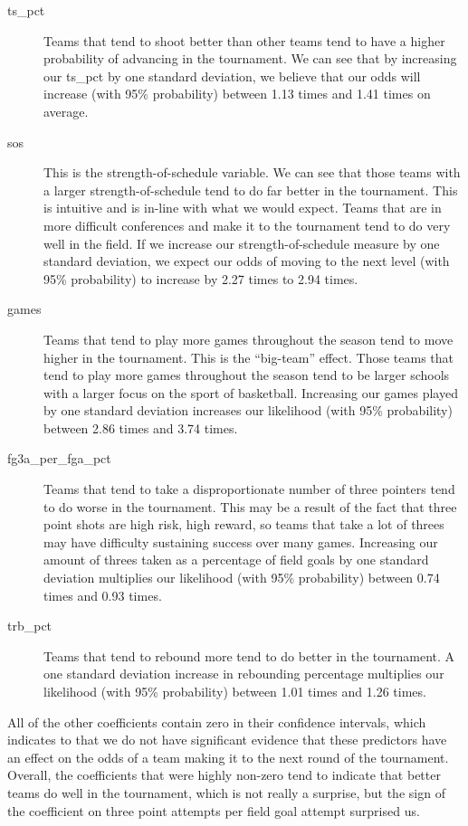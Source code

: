 \documentclass[10pt,a4paper, hidelinks]{article} %
\begin{document}
\begin{description}
	\item[ts\_pct] Teams that tend to shoot better than other teams tend to have a higher probability of advancing in the tournament. We can see that by increasing our ts\_pct by one standard deviation, we believe that our odds will increase  (with 95\% probability)  between 1.13 times and 1.41 times on average. 
	\item[sos] This is the strength-of-schedule variable. We can see that those teams with a larger strength-of-schedule tend to do far better in the tournament. This is intuitive and is in-line with what we would expect. Teams that are in more difficult conferences and make it to the tournament tend to do very well in the field.  If we increase our strength-of-schedule measure by one standard deviation, we expect our odds of moving to the next level (with 95\% probability) to increase by 2.27 times to 2.94 times.
	\item[games] Teams that tend to play more games throughout the season tend to move higher in the tournament. This is the ``big-team'' effect. Those teams that tend to play more games throughout the season tend to be larger schools with a larger focus on the sport of basketball. Increasing our games played by one standard deviation increases our likelihood (with 95\% probability) between 2.86 times and 3.74 times. 
	\item[fg3a\_per\_fga\_pct] Teams that tend to take a disproportionate number of three pointers tend to do worse in the tournament. This may be a result of the fact that three point shots are high risk, high reward, so teams that take a lot of threes may have difficulty sustaining success over many games. Increasing our amount of threes taken as a percentage of field goals by one standard deviation multiplies our likelihood (with 95\% probability) between 0.74 times and 0.93 times. 
	\item[trb\_pct] Teams that tend to rebound more tend to do better in the tournament. A one standard deviation increase in rebounding percentage multiplies our likelihood (with 95\% probability) between 1.01 times and 1.26 times. 
\end{description}
All of the other coefficients contain zero in their confidence intervals, which indicates to that we do not have significant evidence that these predictors have an effect on the odds of a team making it to the next round of the tournament. Overall, the coefficients that were highly non-zero tend to indicate that better teams do well in the tournament, which is not really a surprise, but the sign of the coefficient on three point attempts per field goal attempt surprised us. 
\end{document}
